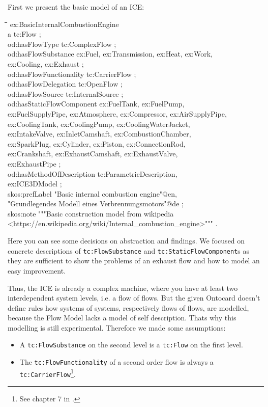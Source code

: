 \documentclass[a4paper,11pt]{article}
\newenvironment{code}{\tt \begin{tabbing}
\hskip12pt\=\hskip12pt\=\hskip12pt\=\hskip12pt\=\hskip5cm\=\hskip5cm\=\kill}
{\end{tabbing}}
\begin{document}
First we present the basic model of an ICE:
\begin{code}
ex:BasicInternalCombustionEngine \\
\> a tc:Flow ; \\
\> od:hasFlowType tc:ComplexFlow ; \\
\> od:hasFlowSubstance ex:Fuel, ex:Transmission, ex:Heat, ex:Work, \\
\>\> ex:Cooling, ex:Exhaust ; \\
\> od:hasFlowFunctionality tc:CarrierFlow ; \\
\> od:hasFlowDelegation tc:OpenFlow ; \\
\> od:hasFlowSource tc:InternalSource ; \\
\> od:hasStaticFlowComponent ex:FuelTank, ex:FuelPump, \+\\
\> ex:FuelSupplyPipe, ex:Atmosphere, ex:Compressor, ex:AirSupplyPipe,\\
\> ex:CoolingTank, ex:CoolingPump, ex:CoolingWaterJacket, \\
\> ex:IntakeValve, ex:InletCamshaft, ex:CombustionChamber, \\
\> ex:SparkPlug, ex:Cylinder, ex:Piston, ex:ConnectionRod, \\
\> ex:Crankshaft, ex:ExhaustCamshaft, ex:ExhaustValve, \\
\> ex:ExhaustPipe ; \-\\
\> od:hasMethodOfDescription tc:ParametricDescription, \\
\>\> ex:ICE3DModel ; \\
\> skos:prefLabel "Basic internal combustion engine"@en, \\
\>\> "Grundlegendes Modell eines Verbrennungsmotors"@de  ; \\
\> skos:note """Basic construction model from wikipedia \\
\>\> <https://en.wikipedia.org/wiki/Internal\_combustion\_engine>""" . 
\end{code}

Here you can see some decisions on abstraction and findings. We focused on
concrete descriptions of \texttt{tc:FlowSubstance} and
\texttt{tc:StaticFlowComponent}s as they are sufficient to show the problems
of an exhaust flow and how to model an easy improvement.

Thus, the ICE is already a complex machine, where you have at least two
interdependent system levels, i.e. a flow of flows. But the given Ontocard
doesn't define rules how systems of systems, respectively flows of flows, are
modelled, because the Flow Model lacks a model of self description. Thats why
this modelling is still experimental. Therefore we made some assumptions: 
\begin{itemize}[noitemsep]
\item A \texttt{tc:FlowSubstance} on the second level is a \texttt{tc:Flow} on
  the first level.
\item The \texttt{tc:FlowFunctionality} of a second order flow is always a
  \texttt{tc:CarrierFlow}\footnote{See chapter 7 in \cite{Lebedyev2015}. }.
\end{itemize}
\end{document}
